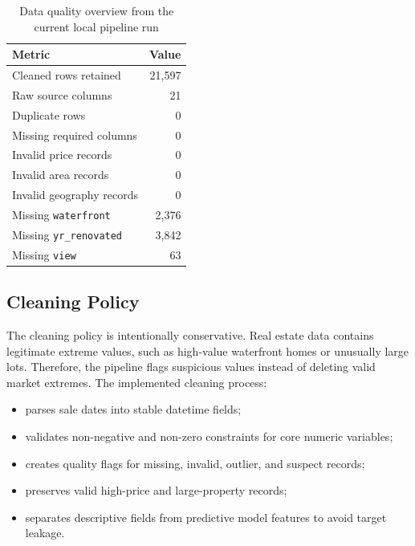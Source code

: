 \documentclass[12pt,a4paper]{article}
\begin{document}
\begin{table}[H]
\centering
\caption{Data quality overview from the current local pipeline run}
\label{tab:data_quality}
\begin{tabular}{lr}
\toprule
\textbf{Metric} & \textbf{Value}\\
\midrule
Cleaned rows retained & 21,597\\
Raw source columns & 21\\
Duplicate rows & 0\\
Missing required columns & 0\\
Invalid price records & 0\\
Invalid area records & 0\\
Invalid geography records & 0\\
Missing \texttt{waterfront} & 2,376\\
Missing \texttt{yr\_renovated} & 3,842\\
Missing \texttt{view} & 63\\
\bottomrule
\end{tabular}
\end{table}

\subsection{Cleaning Policy}
The cleaning policy is intentionally conservative. Real estate data contains legitimate extreme values, such as high-value waterfront homes or unusually large lots. Therefore, the pipeline flags suspicious values instead of deleting valid market extremes. The implemented cleaning process:
\begin{itemize}
    \item parses sale dates into stable datetime fields;
    \item validates non-negative and non-zero constraints for core numeric variables;
    \item creates quality flags for missing, invalid, outlier, and suspect records;
    \item preserves valid high-price and large-property records;
    \item separates descriptive fields from predictive model features to avoid target leakage.
\end{itemize}
\end{document}
